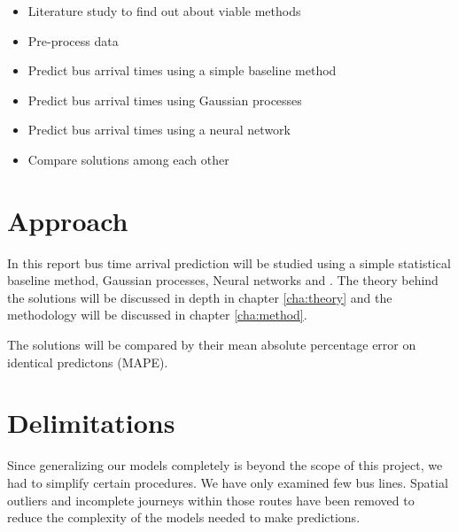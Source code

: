 \begin{itemize}[]
  \item Literature study to find out about viable methods
  \item Pre-process data
  \item Predict bus arrival times using a simple baseline method
  \item Predict bus arrival times using Gaussian processes
  \item Predict bus arrival times using a neural network 
  \item Compare solutions among each other
\end{itemize}

\section{Approach}
\label{sec:research-questions}

In this report bus time arrival prediction will be studied using a simple statistical baseline method, Gaussian processes, Neural networks and . The theory behind the solutions will be discussed in depth in chapter \ref{cha:theory} and the methodology will be discussed in chapter \ref{cha:method}.

The solutions will be compared by their mean absolute percentage error on identical predictons (MAPE).

\section{Delimitations}
\label{sec:delimitations}

Since generalizing our models completely is beyond the scope of this project, we had to simplify certain procedures. We have only examined few bus lines. Spatial outliers and incomplete journeys within those routes have been removed to reduce the complexity of the models needed to make predictions. 




